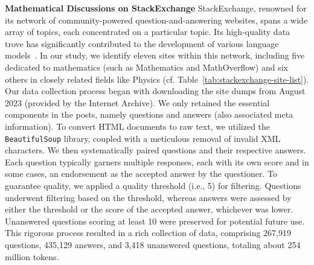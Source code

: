 \noindent\textbf{Mathematical Discussions on StackExchange} \quad StackExchange, renowned for its network of community-powered question-and-answering websites, spans a wide array of topics, each concentrated on a particular topic. Its high-quality data trove has significantly contributed to the development of various language models~. In our study, we identify eleven sites within this network, including five dedicated to mathematics (such as Mathematics and MathOverflow) and six others in closely related fields like Physics (cf. Table~\ref{tab:stackexchange-site-list}). Our data collection process began with downloading the site dumps from August 2023 (provided by the Internet Archive). We only retained the essential components in the posts, namely questions and answers (also associated meta information). To convert HTML documents to raw text, we utilized the \texttt{BeautifulSoup} library, coupled with a meticulous removal of invalid XML characters. We then systematically paired questions and their respective answers. Each question typically garners multiple responses, each with its own score and in some cases, an endorsement as the accepted answer by the questioner.  To guarantee quality, we applied a quality threshold (i.e., 5) for filtering. Questions underwent filtering based on the threshold, whereas answers were assessed by either the threshold or the score of the accepted answer, whichever was lower. Unanswered questions scoring at least 10 were preserved for potential future use. This rigorous process resulted in a rich collection of data, comprising 267,919 questions, 435,129 answers, and 3,418 unanswered questions, totaling about 254 million tokens.

